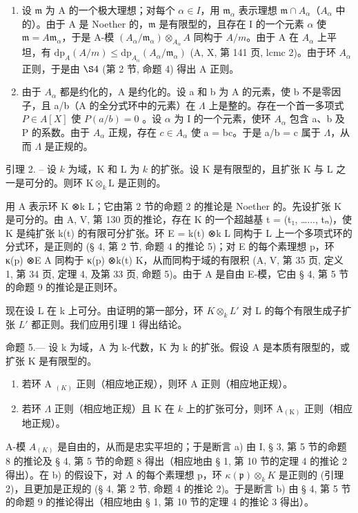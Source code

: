\begin{enumerate}
\def\labelenumi{\alph{enumi})}
\item
  设 \(\mathfrak{m}\) 为 A 的一个极大理想；对每个 \(\alpha \in I\)，用 \(\mathfrak{m}_{\alpha}\) 表示理想 \(\mathfrak{m} \cap A_{\alpha}\)（\(A_{\alpha}\) 中的）。由于 A 是 Noether 的，\(\mathfrak{m}\) 是有限型的，且存在 I 的一个元素 \(\alpha\) 使 \(\mathfrak{m} = A\mathfrak{m}_{\alpha}\)，于是 A-模 \((A_{\alpha}/\mathfrak{m}_{\alpha}) \otimes_{A_{\alpha}} A\) 同构于 \(A/m\)。由于 A 在 \(A_{\alpha}\) 上平坦，有 \(\mathrm{dp}_{A}(A/m) \leqslant \mathrm{dp}_{A_{\alpha}}(A_{\alpha}/\mathfrak{m}_{\alpha})\) (A, X, 第 141 页, lcmc 2)。由于环 \(A_{\alpha}\) 正则，于是由 \(\S 4\) (第 2 节, 命题 4) 得出 A 正则。
\item
  由于 \(A_{\alpha}\) 都是约化的，A 是约化的。设 a 和 b 为 A 的元素，使 b 不是零因子，且 a/b（A 的全分式环中的元素）在 \(\Lambda\) 上是整的。存在一个首一多项式 \(P \in A[X]\) 使 \(P(a/b) = 0\) 。设 \(\alpha\) 为 I 的一个元素，使环 \(A_{\alpha}\) 包含 a、b 及 P 的系数。由于 \(A_{\alpha}\) 正规，存在 \(c \in A_{\alpha}\) 使 a = bc。于是 a/b = c 属于 \(\Lambda\)，从而 \(\Lambda\) 是正规的。
\end{enumerate}

引理 2. -- 设 \(k\) 为域，K 和 L 为 \(k\) 的扩张。设 K 是有限型的，且扩张 K 与 L 之一是可分的。则环 \(\mathrm{K} \otimes_{k} \mathrm{L}\) 是正则的。

用 A 表示环 K ⊗k L；它由第 2 节的命题 2 的推论是 Noether 的。先设扩张 K 是可分的。由 A, V, 第 130 页的推论，存在 K 的一个超越基 t = (t₁, \ldots..., tₙ)，使 K 是纯扩张 k(t) 的有限可分扩张。环 E = k(t) ⊗k L 同构于 L 上一个多项式环的分式环，是正则的 (§ 4, 第 2 节, 命题 4 的推论 5)；对 E 的每个素理想 p，环 κ(p) ⊗E A 同构于 κ(p) ⊗k(t) K，从而同构于域的有限积 (A, V, 第 35 页, 定义 1, 第 34 页, 定理 4, 及第 33 页, 命题 5)。由于 A 是自由 E-模，它由 § 4, 第 5 节的命题 9 的推论是正则环。

现在设 L 在 k 上可分。由证明的第一部分，环 \(K \otimes_{k} L'\) 对 L 的每个有限生成子扩张 \(L'\) 都正则。我们应用引理 1 得出结论。

命题 5.--- 设 k 为域，A 为 k-代数，K 为 k 的扩张。假设 A 是本质有限型的，或扩张 K 是有限型的。

\begin{enumerate}
\def\labelenumi{\alph{enumi})}
\item
  若环 A \(_{(K)}\) 正则（相应地正规），则环 A 正则（相应地正规）。
\item
  若环 \(\Lambda\) 正则（相应地正规）且 K 在 \(k\) 上的扩张可分，则环 \(\mathrm{A}_{(\mathrm{K})}\) 正则（相应地正规）。
\end{enumerate}

A-模 \(A_{(K)}\) 是自由的，从而是忠实平坦的；于是断言 a) 由 I, § 3, 第 5 节的命题 8 的推论及 § 4, 第 5 节的命题 8 得出（相应地由 § 1, 第 10 节的定理 4 的推论 2 得出）。在 b) 的假设下，对 A 的每个素理想 p，环 \(\kappa(\mathfrak{p})\otimes_{k}K\) 是正则的 (引理 2)，且更加是正规的 (§ 4, 第 2 节, 命题 4 的推论 2)。于是断言 b) 由 § 4, 第 5 节的命题 9 的推论得出（相应地由 § 1, 第 10 节的定理 4 的推论 3 得出）。
